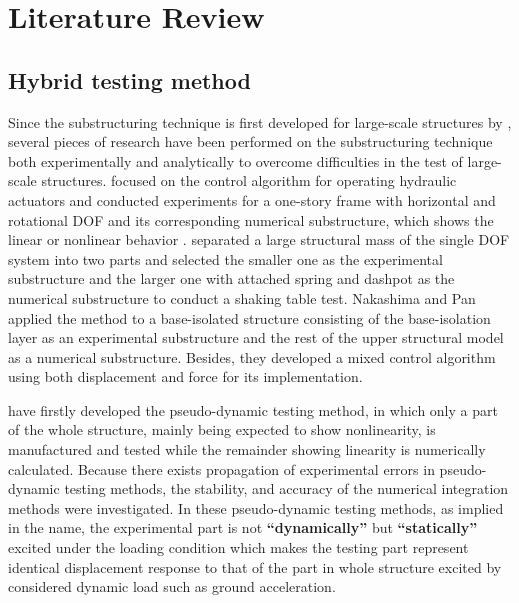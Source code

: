 \section{Literature Review}
\subsection{Hybrid testing method}
Since the substructuring technique is first developed for large-scale structures by \citet{nakashima1992development}, several pieces of research have been performed on the substructuring technique both experimentally and analytically to overcome difficulties in the test of large-scale structures. \citet{blakeborough2001development,darby2001improved} focused on the control algorithm for operating hydraulic actuators and conducted experiments for a one-story frame with horizontal and rotational DOF and its corresponding numerical substructure, which shows the linear or nonlinear behavior \citep{darby2002stability}. \citet{neild2005control} separated a large structural mass of the single DOF system into two parts and selected the smaller one as the experimental substructure and the larger one with attached spring and dashpot as the numerical substructure to conduct a shaking table test\citep{neild2005control}. Nakashima and Pan applied the method to a base-isolated structure consisting of the base-isolation layer as an experimental substructure and the rest of the upper structural model as a numerical substructure\citep{nakashima1999real}. Besides, they developed a mixed control algorithm using both displacement and force for its implementation\citep{pan2005online}.

\citet{takanashi1975nonlinear,takanashi1980inelastic} have firstly developed the pseudo-dynamic testing method, in which only a part of the whole structure, mainly being expected to show nonlinearity, is manufactured and tested while the remainder showing linearity is numerically calculated\citep{takanashi1975nonlinear,takanashi1980inelastic}. Because there exists propagation of experimental errors in pseudo-dynamic testing methods, the stability, and accuracy of the numerical integration methods were investigated\citep{shing1983experimental,shing1984pseudodynamic}. In these pseudo-dynamic testing methods, as implied in the name, the experimental part is not \textbf{``dynamically''} but \textbf{``statically''} excited under the loading condition which makes the testing part represent identical displacement response to that of the part in whole structure excited by considered dynamic load such as ground acceleration.

